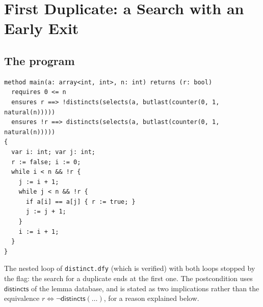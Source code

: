 \section{First Duplicate: a Search with an Early Exit}\label{sec:fd}

\subsection{The program}
\begin{lstlisting}
method main(a: array<int, int>, n: int) returns (r: bool)
  requires 0 <= n
  ensures r ==> !distincts(selects(a, butlast(counter(0, 1, natural(n)))))
  ensures !r ==> distincts(selects(a, butlast(counter(0, 1, natural(n)))))
{
  var i: int; var j: int;
  r := false; i := 0;
  while i < n && !r {
    j := i + 1;
    while j < n && !r {
      if a[i] == a[j] { r := true; }
      j := j + 1;
    }
    i := i + 1;
  }
}
\end{lstlisting}
The nested loop of \texttt{distinct.dfy} (which is verified) with both loops stopped by the flag: the
search for a duplicate ends at the first one. The postcondition uses $\mathsf{distincts}$ of the lemma
database, and is stated as two implications rather than the equivalence $r \Leftrightarrow \neg\mathsf{distincts}(\ldots)$,
for a reason explained below.

